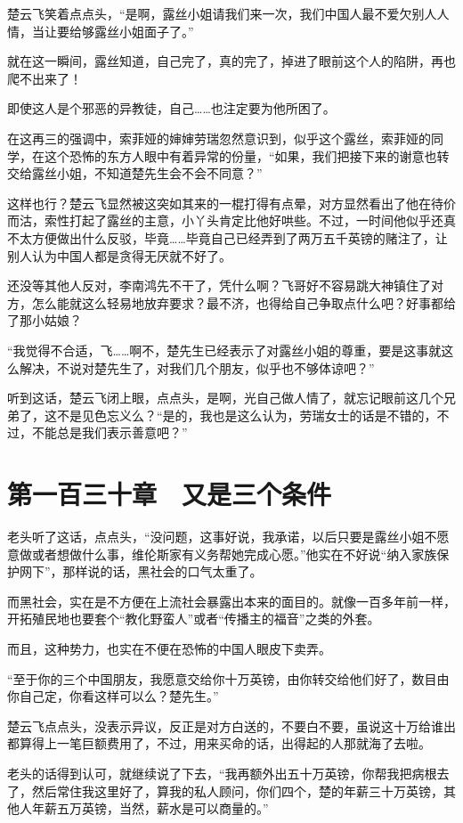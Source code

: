 楚云飞笑着点点头，“是啊，露丝小姐请我们来一次，我们中国人最不爱欠别人人情，当让要给够露丝小姐面子了。”

就在这一瞬间，露丝知道，自己完了，真的完了，掉进了眼前这个人的陷阱，再也爬不出来了！

即使这人是个邪恶的异教徒，自己……也注定要为他所困了。

在这再三的强调中，索菲娅的婶婶劳瑞忽然意识到，似乎这个露丝，索菲娅的同学，在这个恐怖的东方人眼中有着异常的份量，“如果，我们把接下来的谢意也转交给露丝小姐，不知道楚先生会不会不同意？”

这样也行？楚云飞显然被这突如其来的一棍打得有点晕，对方显然看出了他在待价而沽，索性打起了露丝的主意，小丫头肯定比他好哄些。不过，一时间他似乎还真不太方便做出什么反驳，毕竟……毕竟自己已经弄到了两万五千英镑的赌注了，让别人认为中国人都是贪得无厌就不好了。

还没等其他人反对，李南鸿先不干了，凭什么啊？飞哥好不容易跳大神镇住了对方，怎么能就这么轻易地放弃要求？最不济，也得给自己争取点什么吧？好事都给了那小姑娘？

“我觉得不合适，飞……啊不，楚先生已经表示了对露丝小姐的尊重，要是这事就这么解决，不说对楚先生了，对我们几个朋友，似乎也不够体谅吧？”

听到这话，楚云飞闭上眼，点点头，是啊，光自己做人情了，就忘记眼前这几个兄弟了，这不是见色忘义么？“是的，我也是这么认为，劳瑞女士的话是不错的，不过，不能总是我们表示善意吧？”

\section{第一百三十章　又是三个条件}

老头听了这话，点点头，“没问题，这事好说，我承诺，以后只要是露丝小姐不愿意做或者想做什么事，维伦斯家有义务帮她完成心愿。”他实在不好说“纳入家族保护网下”，那样说的话，黑社会的口气太重了。

而黑社会，实在是不方便在上流社会暴露出本来的面目的。就像一百多年前一样，开拓殖民地也要套个“教化野蛮人”或者“传播主的福音”之类的外套。

而且，这种势力，也实在不便在恐怖的中国人眼皮下卖弄。

“至于你的三个中国朋友，我愿意交给你十万英镑，由你转交给他们好了，数目由你自己定，你看这样可以么？楚先生。”

楚云飞点点头，没表示异议，反正是对方白送的，不要白不要，虽说这十万给谁出都算得上一笔巨额费用了，不过，用来买命的话，出得起的人那就海了去啦。

老头的话得到认可，就继续说了下去，“我再额外出五十万英镑，你帮我把病根去了，然后常住我这里好了，算我的私人顾问，你们四个，楚的年薪三十万英镑，其他人年薪五万英镑，当然，薪水是可以商量的。”

